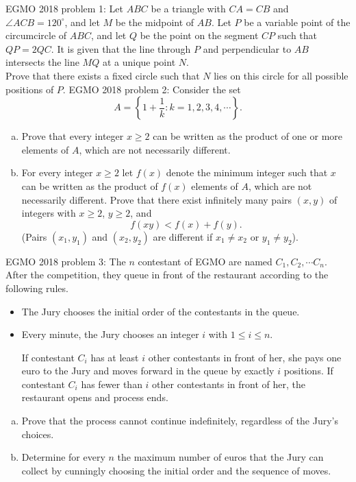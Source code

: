 EGMO 2018 problem 1:  Let $ABC$ be a triangle with $CA=CB$ and $\angle{ACB}=120^\circ$, and let $M$ be the midpoint of $AB$. Let $P$ be a variable point of the circumcircle of $ABC$, and let $Q$ be the point on the segment $CP$ such that $QP = 2QC$. It is given that the line through $P$ and perpendicular to $AB$ intersects the line $MQ$ at a unique point $N$. \\
Prove that there exists a fixed circle such that $N$ lies on this circle for all possible positions of $P$. 
EGMO 2018 problem 2:  Consider the set
\[ A = \left\{1+\frac{1}{k} : k=1,2,3,4,\cdots \right\}. \]
\begin{enumerate}[a.]
  \item Prove that every integer $x \geq 2$ can be written as the product of one or more elements of $A$, which are not necessarily different.

  \item For every integer $x \geq 2$ let $f(x)$ denote the minimum integer such that $x$ can be written as the
product of $f(x)$ elements of $A$, which are not necessarily different.
Prove that there exist infinitely many pairs $(x,y)$ of integers with $x\geq 2$, $y \geq 2$, and
\[ f(xy)<f(x)+f(y). \]
(Pairs $(x_1,y_1)$ and $(x_2,y_2)$ are different if $x_1 \neq x_2$ or $y_1 \neq y_2$).
\end{enumerate} 
EGMO 2018 problem 3:  The $n$ contestant of EGMO are named $C_1, C_2, \cdots C_n$. After the competition, they queue in front of the restaurant according to the following rules.
\begin{itemize}
  \item The Jury chooses the initial order of the contestants in the queue.
  \item Every minute, the Jury chooses an integer $i$ with $1 \leq i \leq n$.

If contestant $C_i$ has at least $i$ other contestants in front of her, she pays one euro to the Jury and moves forward in the queue by exactly $i$ positions.
If contestant $C_i$ has fewer than $i$ other contestants in front of her, the restaurant opens and process ends.


\end{itemize}
\begin{enumerate}[a.]
  \item Prove that the process cannot continue indefinitely, regardless of the Jury’s choices.
  \item Determine for every $n$ the maximum number of euros that the Jury can collect by cunningly choosing the initial order and the sequence of moves.
\end{enumerate} 
